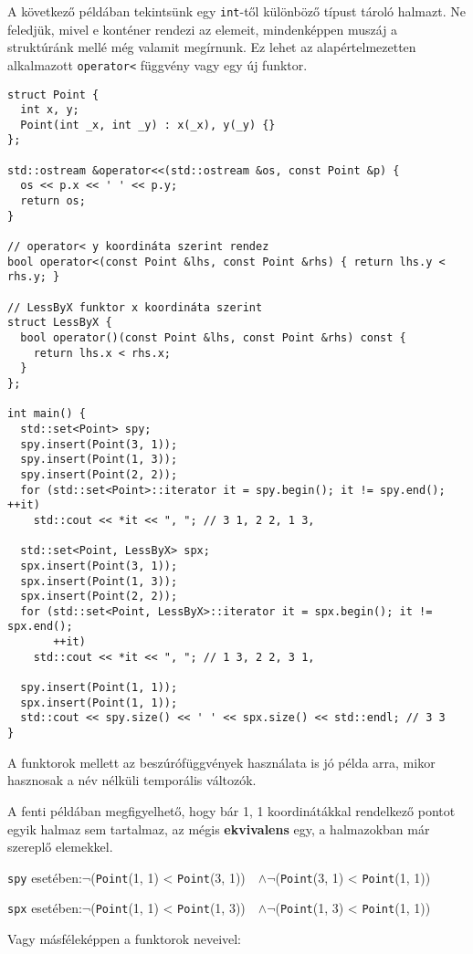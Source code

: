 \documentclass[../cpp_book/cpp_book.tex]{subfiles}
\begin{document}
	\medskip
	A következő példában tekintsünk egy \texttt{int}-től különböző típust tároló halmazt. Ne feledjük, mivel e konténer rendezi az elemeit, mindenképpen muszáj a struktúránk mellé még valamit megírnunk. Ez lehet az alapértelmezetten alkalmazott \texttt{operator<} függvény vagy egy új funktor.
\begin{lstlisting}
struct Point {
  int x, y;
  Point(int _x, int _y) : x(_x), y(_y) {}
};

std::ostream &operator<<(std::ostream &os, const Point &p) {
  os << p.x << ' ' << p.y;
  return os;
}

// operator< y koordináta szerint rendez
bool operator<(const Point &lhs, const Point &rhs) { return lhs.y < rhs.y; }

// LessByX funktor x koordináta szerint
struct LessByX {
  bool operator()(const Point &lhs, const Point &rhs) const {
    return lhs.x < rhs.x;
  }
};

int main() {
  std::set<Point> spy;
  spy.insert(Point(3, 1));
  spy.insert(Point(1, 3));
  spy.insert(Point(2, 2));
  for (std::set<Point>::iterator it = spy.begin(); it != spy.end(); ++it)
    std::cout << *it << ", "; // 3 1, 2 2, 1 3,

  std::set<Point, LessByX> spx;
  spx.insert(Point(3, 1));
  spx.insert(Point(1, 3));
  spx.insert(Point(2, 2));
  for (std::set<Point, LessByX>::iterator it = spx.begin(); it != spx.end();
       ++it)
    std::cout << *it << ", "; // 1 3, 2 2, 3 1,

  spy.insert(Point(1, 1));
  spx.insert(Point(1, 1));
  std::cout << spy.size() << ' ' << spx.size() << std::endl; // 3 3
}
\end{lstlisting}
	\begin{note}
		A funktorok mellett az beszúrófüggvények használata is jó példa arra, mikor hasznosak a név nélküli temporális változók.
	\end{note}
	A fenti példában megfigyelhető, hogy bár 1, 1 koordinátákkal rendelkező pontot egyik halmaz sem tartalmaz, az mégis \textbf{ekvivalens} egy, a halmazokban már szereplő elemekkel.
	
	\begin{center}	
		\texttt{spy} esetében:\quad  $\neg$\big(\texttt{Point}(1, 1) < \texttt{Point}(3, 1)\big) \,\, $\wedge$\quad $\neg$\big(\texttt{Point}(3, 1) < \texttt{Point}(1, 1)\big)
		
		\texttt{spx} esetében:\quad  $\neg$\big(\texttt{Point}(1, 1) < \texttt{Point}(1, 3)\big) \,\, $\wedge$\quad $\neg$\big(\texttt{Point}(1, 3) < \texttt{Point}(1, 1)\big)
	\end{center}
	Vagy másféleképpen a funktorok neveivel:
	
\end{document}
